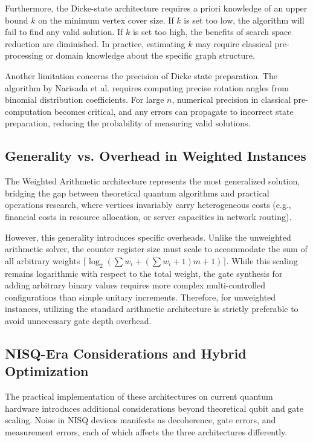 \documentclass{ieeeaccess}
\begin{document}
Furthermore, the Dicke-state architecture requires a priori knowledge of an upper bound $k$ on the minimum vertex cover size. If $k$ is set too low, the algorithm will fail to find any valid solution. If $k$ is set too high, the benefits of search space reduction are diminished. In practice, estimating $k$ may require classical pre-processing or domain knowledge about the specific graph structure.

Another limitation concerns the precision of Dicke state preparation. The algorithm by Narisada et al. requires computing precise rotation angles from binomial distribution coefficients. For large $n$, numerical precision in classical pre-computation becomes critical, and any errors can propagate to incorrect state preparation, reducing the probability of measuring valid solutions.

\subsection{Generality vs. Overhead in Weighted Instances}

The Weighted Arithmetic architecture represents the most generalized solution, bridging the gap between theoretical quantum algorithms and practical operations research, where vertices invariably carry heterogeneous costs (e.g., financial costs in resource allocation, or server capacities in network routing). 

However, this generality introduces specific overheads. Unlike the unweighted arithmetic solver, the counter register size must scale to accommodate the sum of all arbitrary weights $\lceil\log_2(\sum w_i + (\sum w_i + 1)m + 1)\rceil$. While this scaling remains logarithmic with respect to the total weight, the gate synthesis for adding arbitrary binary values requires more complex multi-controlled configurations than simple unitary increments. Therefore, for unweighted instances, utilizing the standard arithmetic architecture is strictly preferable to avoid unnecessary gate depth overhead.

\subsection{NISQ-Era Considerations and Hybrid Optimization}
The practical implementation of these architectures on current quantum hardware introduces additional considerations beyond theoretical qubit and gate scaling. Noise in NISQ devices manifests as decoherence, gate errors, and measurement errors, each of which affects the three architectures differently.
\end{document}

